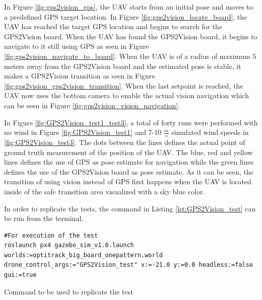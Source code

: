 \documentclass[../Head/report.tex]{subfiles}
\begin{document}
In Figure \ref{fig:gps2vision_gps}, the UAV starts from an initial pose and moves to a predefined GPS target location. In Figure \ref{fig:gps2vision_locate_board}, the UAV has reached the target GPS location and begins to search for the GPS2Vision board. When the UAV has found the GPS2Vision board, it begins to navigate to it still using GPS as seen in Figure \ref{fig:gps2vision_navigate_to_board}. When the UAV is of a radius of maximum 5 meters away from the GPS2Vision board and the estimated pose is stable, it makes a GPS2Vision transition as seen in Figure \ref{fig:gps2vision_gps2vision_transition}. When the last setpoint is reached, the UAV now uses the bottom camera to enable the actual vision navigation which can be seen in Figure \ref{fig:gps2vision_vision_navigation}. 

In Figure \ref{fig:GPS2Vision_test1_test3}, a total of forty runs were performed with no wind in Figure \ref{fig:GPS2Vision_test1} and 7-10 $\frac{m}{s}$ simulated wind speeds in \ref{fig:GPS2Vision_test3}. The dots between the lines defines the actual point of ground truth measurement of the position of the UAV. The blue, red and yellow lines defines the use of GPS as pose estimate for navigation while the green lines defines the use of the GPS2Vision board as pose estimate. As it can be seen, the
transition of using vision instead of GPS first happens when the UAV is located inside of the safe transition area visualized with a sky blue color. 

In order to replicate the tests, the command in Listing \ref{lst:GPS2Vision_test} can be run from the terminal.

\begin{listing}[H] 
\begin{tcolorbox}[
    enhanced,
    attach boxed title to top left={xshift=6mm,yshift=-3mm},
    colback=lightgreen!20,
    colframe=lightgreen,
    fonttitle=\bfseries\color{black},
]
\begin{verbatim}
#For execution of the test
roslaunch px4 gazebo_sim_v1.0.launch worlds:=optitrack_big_board_onepattern.world drone_control_args:="GPS2Vision_test" x:=-21.0 y:=0.0 headless:=false gui:=true
\end{verbatim}
\end{tcolorbox}
\caption{Command to be used to replicate the test}
\label{lst:GPS2Vision_test}    
\end{listing} 
\end{document}
